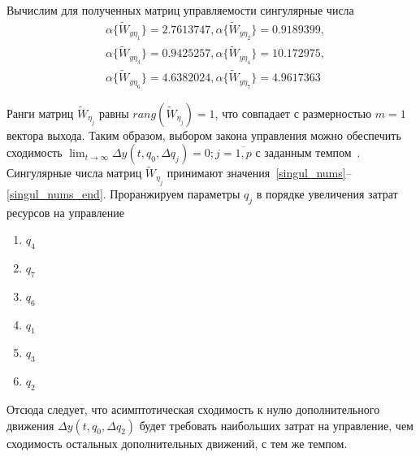 Вычислим для полученных матриц управляемости сингулярные числа
\begin{align}\label{singul_nums}
	&\alpha\{\tilde{W}_{y \eta_{1}}\} = 2.7613747,
	\alpha\{\tilde{W}_{y \eta_{2}}\} = 0.9189399,\\	
	&\alpha\{\tilde{W}_{y \eta_{3}}\} = 0.9425257,	
	\alpha\{\tilde{W}_{y \eta_{4}}\} = 10.172975,\\		
	&\alpha\{\tilde{W}_{y \eta_{6}}\} = 4.6382024,
	\alpha\{\tilde{W}_{y \eta_{7}}\} = 4.9617363
	\label{singul_nums_end}
\end{align}



Ранги матриц $\tilde{W}_{\eta_j}$ равны $rang(\tilde{W}_{\eta_j}) = 1$, что совпадает с размерностью $m = 1$ вектора выхода. Таким образом, выбором закона
управления можно обеспечить сходимость $\lim_{t  \to \infty} \Delta y (t,q_0,\Delta q_j) = 0; j = \overline{1, p}$ с заданным темпом~\cite{NSUsh}. 
Сингулярные числа матриц $\tilde{W}_{\eta_j}$ принимают значения~\ref{singul_nums}--\ref{singul_nums_end}. Проранжируем параметры $q_j$ в порядке увеличения затрат ресурсов на управление
\begin{enumerate}
	\item $q_4$
	\item $q_7$
	\item $q_6$
	\item $q_1$
	\item $q_3$
	\item $q_2$			
\end{enumerate}

Отсюда следует, что асимптотическая сходимость к нулю дополнительного движения $\Delta y (t,q_0,\Delta q_2)$ будет требовать наибольших затрат на управление, чем сходимость остальных дополнительных движений, с тем же темпом.

\newpage